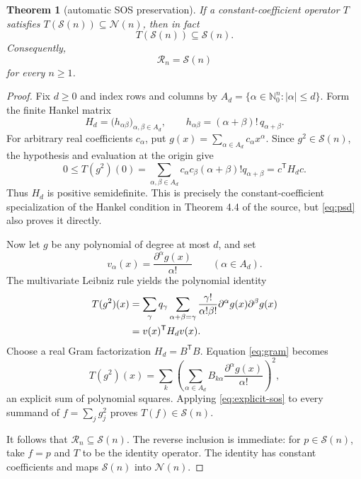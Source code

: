 \documentclass[11pt]{article}
\newtheorem{theorem}{Theorem}
\theoremstyle{remark}
\newcommand{\Nzero}{\mathbb N_0}
\newcommand{\SOS}{\mathcal S}
\newcommand{\POS}{\mathcal N}
\newcommand{\Reach}{\mathcal R}
\begin{document}
\begin{theorem}[automatic SOS preservation]\label{thm:auto}
If a constant-coefficient operator $T$ satisfies
$T(\SOS(n))\subseteq\POS(n)$, then in fact
\[
 T(\SOS(n))\subseteq\SOS(n).
\]
Consequently,
\[
 \boxed{\Reach_n=\SOS(n)}
\]
for every $n\geq1$.
\end{theorem}

\begin{proof}
Fix $d\geq0$ and index rows and columns by
$A_d=\{\alpha\in\Nzero^n:|\alpha|\leq d\}$.  Form the finite Hankel matrix
\begin{equation}\label{eq:H}
 H_d=\bigl(h_{\alpha\beta}\bigr)_{\alpha,\beta\in A_d},
 \qquad
 h_{\alpha\beta}=(\alpha+\beta)!\,q_{\alpha+\beta}.
\end{equation}
For arbitrary real coefficients $c_\alpha$, put
$g(x)=\sum_{\alpha\in A_d}c_\alpha x^\alpha$.  Since $g^2\in\SOS(n)$,
the hypothesis and evaluation at the origin give
\begin{equation}\label{eq:psd}
 0\leq T(g^2)(0)
 =\sum_{\alpha,\beta\in A_d}
 c_\alpha c_\beta(\alpha+\beta)!q_{\alpha+\beta}
 =c^{\mathsf T}H_dc.
\end{equation}
Thus $H_d$ is positive semidefinite.  This is precisely the
constant-coefficient specialization of the Hankel condition in Theorem 4.4
of the source, but \eqref{eq:psd} also proves it directly.

Now let $g$ be any polynomial of degree at most $d$, and set
\[
 v_\alpha(x)=\frac{\partial^\alpha g(x)}{\alpha!}
 \qquad(\alpha\in A_d).
\]
The multivariate Leibniz rule yields the polynomial identity
\begin{align}
 T(g^2)(x)
 &=\sum_{\gamma}q_\gamma
   \sum_{\alpha+\beta=\gamma}
   \frac{\gamma!}{\alpha!\beta!}
   \partial^\alpha g(x)\partial^\beta g(x) \notag\\
 &=v(x)^{\mathsf T}H_dv(x).                       \label{eq:gram}
\end{align}
Choose a real Gram factorization $H_d=B^{\mathsf T}B$.  Equation
\eqref{eq:gram} becomes
\begin{equation}\label{eq:explicit-sos}
 T(g^2)(x)=\sum_k\left(
   \sum_{\alpha\in A_d}B_{k\alpha}
   \frac{\partial^\alpha g(x)}{\alpha!}
 \right)^2,
\end{equation}
an explicit sum of polynomial squares.  Applying \eqref{eq:explicit-sos}
to every summand of $f=\sum_jg_j^2$ proves
$T(f)\in\SOS(n)$.

It follows that $\Reach_n\subseteq\SOS(n)$.  The reverse inclusion is
immediate: for $p\in\SOS(n)$, take $f=p$ and $T$ to be the identity
operator.  The identity has constant coefficients and maps $\SOS(n)$ into
$\POS(n)$.
\end{proof}
\end{document}
